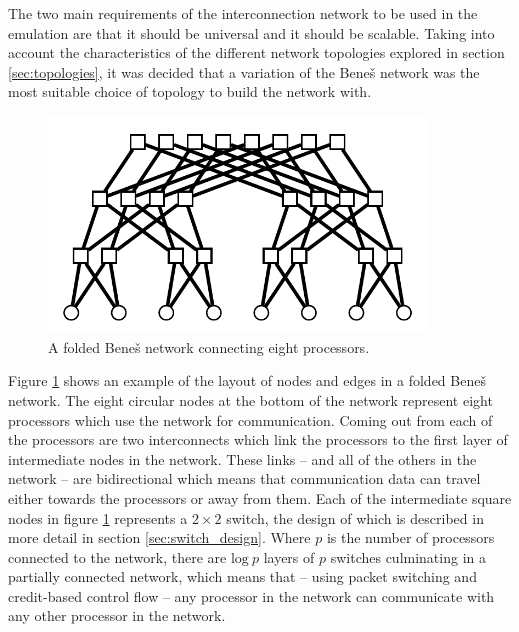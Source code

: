 \documentclass[a4paper, 12pt]{article}
\begin{document}
The two main requirements of the interconnection network to be used in the emulation are that it should be universal and it should be scalable. Taking into account the characteristics of the different network topologies explored in section \ref{sec:topologies}, it was decided that a variation of the Bene\v{s} network was the most suitable choice of topology to build the network with.

\begin{figure}[H]
\centering
\includegraphics[width=10cm]{benes_network.png}
\caption[A folded Bene\v{s} network connecting eight processors]{A folded Bene\v{s} network connecting eight processors. \cite{Han14}}
\label{fig:benes}
\end{figure}

Figure \ref{fig:benes} shows an example of the layout of nodes and edges in a folded Bene\v{s} network. The eight circular nodes at the bottom of the network represent eight processors which use the network for communication. Coming out from each of the processors are two interconnects which link the processors to the first layer of intermediate nodes in the network. These links -- and all of the others in the network -- are bidirectional which means that communication data can travel either towards the processors or away from them. Each of the intermediate square nodes in figure \ref{fig:benes} represents a $2 \times 2$ switch, the design of which is described in more detail in section \ref{sec:switch_design}. Where $p$ is the number of processors connected to the network, there are $\mathrm{log}\ p$ layers of $p$ switches culminating in a partially connected network, which means that -- using packet switching and credit-based control flow -- any processor in the network can communicate with any other processor in the network.
\end{document}
